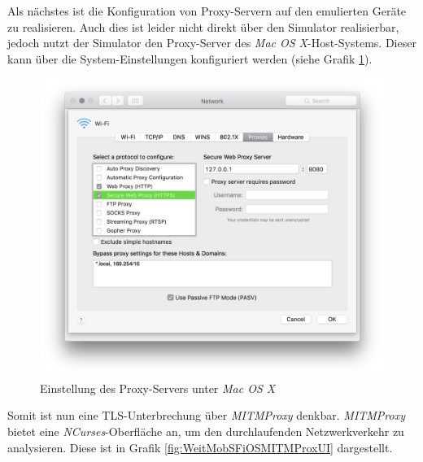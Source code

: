 Als nächstes ist die Konfiguration von Proxy-Servern auf den emulierten Geräte zu realisieren. Auch dies ist leider nicht direkt über den Simulator realisierbar, jedoch nutzt der Simulator den Proxy-Server des\textit{ Mac OS X}-Host-Systems. Dieser kann über die System-Einstellungen konfiguriert werden (siehe Grafik \ref{fig:WeitMobSFiOSProxySettings}).\\

\begin{figure}[htbp]
	\centering
	\includegraphics[width=\textwidth]{bilder/pentest_mobile_anwendungen/weiterentw_mobsf/proxy_settings.png}
	\caption{Einstellung des Proxy-Servers unter \textit{Mac OS X}}
	\label{fig:WeitMobSFiOSProxySettings}
\end{figure}

Somit ist nun eine TLS-Unterbrechung über \textit{MITMProxy} denkbar. \textit{MITMProxy} bietet eine \textit{NCurses}-Oberfläche an, um den durchlaufenden Netzwerkverkehr zu analysieren. Diese ist in Grafik \ref{fig:WeitMobSFiOSMITMProxUI} dargestellt.\\

